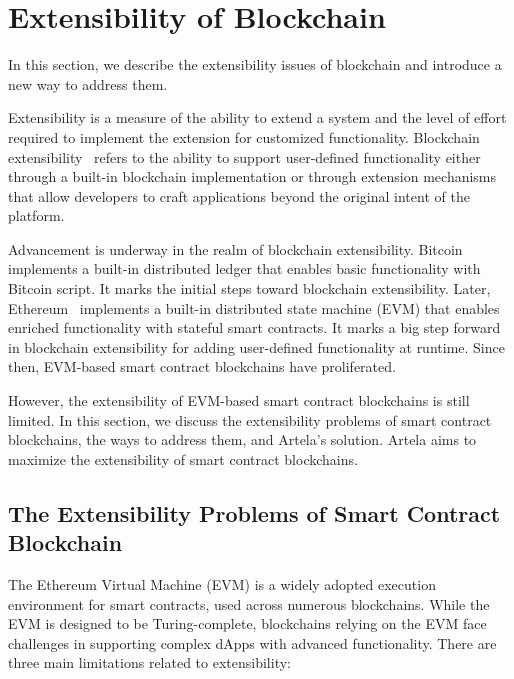 
\section{Extensibility of Blockchain}

In this section, we describe the extensibility issues of blockchain and introduce a new way to address them. 

Extensibility\cite{Article} is a measure of the ability to extend a system and the level of effort required to implement the extension for customized functionality. Blockchain extensibility~\cite{x} refers to the ability to support user-defined functionality either through a built-in blockchain implementation or through extension mechanisms that allow developers to craft applications beyond the original intent of the platform.

Advancement is underway in the realm of blockchain extensibility. Bitcoin~\cite{x} implements a built-in distributed ledger that enables basic functionality with Bitcoin script. It marks the initial steps toward blockchain extensibility. Later, Ethereum~\cite{x} implements a built-in distributed state machine (EVM) that enables enriched functionality with stateful smart contracts. It marks a big step forward in blockchain extensibility for adding user-defined functionality at runtime. Since then, EVM-based smart contract blockchains have proliferated.

However, the extensibility of EVM-based smart contract blockchains is still limited. In this section, we discuss the extensibility problems of smart contract blockchains, the ways to address them, and Artela's solution. Artela aims to maximize the extensibility of smart contract blockchains.

\subsection{The Extensibility Problems of Smart Contract Blockchain}

The Ethereum Virtual Machine (EVM) is a widely adopted execution environment for smart contracts, used across numerous blockchains. While the EVM is designed to be Turing-complete, blockchains relying on the EVM face challenges in supporting complex dApps with advanced functionality. There are three main limitations related to extensibility:

